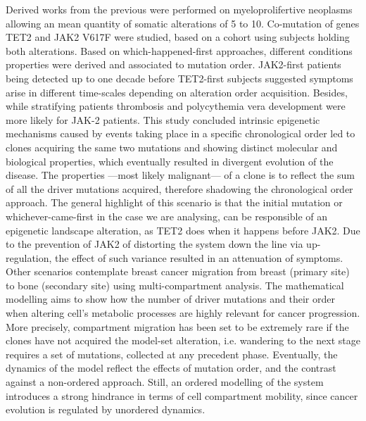 Derived works from the previous were performed \cite{Herbet2012AcquisitionPhenotypes} on myeloprolifertive neoplasms allowing an mean quantity of somatic alterations of 5 to 10. Co-mutation of genes TET2 \cite{Delhommeau2009MutationCancers} and JAK2 V617F \cite{Levine2007JAK-2Disease} were studied, based on a cohort using subjects holding both alterations. Based on which-happened-first approaches, different conditions properties were derived and associated to mutation order. JAK2-first patients being detected up to one decade  before TET2-first subjects suggested symptoms arise in different time-scales depending on alteration order acquisition. Besides, while stratifying patients thrombosis and polycythemia vera development were more likely for JAK-2 patients. This study concluded intrinsic epigenetic mechanisms caused by events taking place in a specific chronological order led to clones acquiring the same two mutations and showing distinct molecular and biological properties, which eventually resulted in divergent evolution of the disease. The properties —most likely malignant— of a clone is to reflect the sum of all the driver mutations acquired, therefore shadowing the chronological order approach. The general highlight of this scenario is that the initial mutation or whichever-came-first in the case we are analysing, can be responsible of an epigenetic landscape alteration, as TET2 does when it happens before JAK2. Due to the prevention of JAK2 of distorting the system down the line via up-regulation, the effect of such variance resulted in an attenuation of symptoms.
\\

Other scenarios \cite{Ascolani2019ModelingMatter} contemplate breast cancer migration from breast (primary site) to bone (secondary site) using multi-compartment analysis. The mathematical modelling aims to show how the number of driver mutations and their order when altering cell’s metabolic processes are highly relevant for cancer progression. More precisely, compartment migration has been set to be extremely rare if the clones have not acquired the model-set alteration, i.e. wandering to the next stage requires a set of mutations, collected at any precedent phase. Eventually, the dynamics of the model reflect the effects of mutation order, and the contrast against a non-ordered approach. Still, an ordered modelling of the system introduces a strong hindrance in terms of cell compartment mobility, since cancer evolution is regulated by unordered dynamics.
\\

